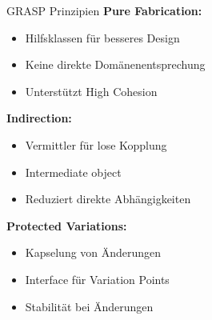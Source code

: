 \begin{concept}{GRASP Prinzipien}
\textbf{Pure Fabrication:}
\begin{itemize}
    \item Hilfsklassen für besseres Design
    \item Keine direkte Domänenentsprechung
    \item Unterstützt High Cohesion
\end{itemize}

\textbf{Indirection:}
\begin{itemize}
    \item Vermittler für lose Kopplung
    \item Intermediate object
    \item Reduziert direkte Abhängigkeiten
\end{itemize}

\textbf{Protected Variations:}
\begin{itemize}
    \item Kapselung von Änderungen
    \item Interface für Variation Points
    \item Stabilität bei Änderungen
\end{itemize}
\end{concept}

\columnbreak

